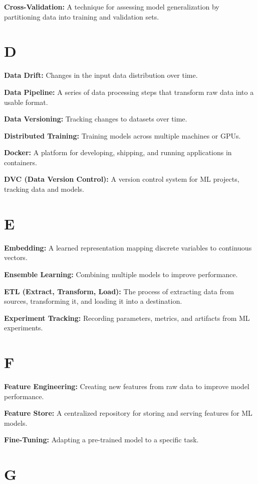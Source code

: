 \textbf{Cross-Validation:} A technique for assessing model generalization by partitioning data into training and validation sets.

\section*{D}

\textbf{Data Drift:} Changes in the input data distribution over time.

\textbf{Data Pipeline:} A series of data processing steps that transform raw data into a usable format.

\textbf{Data Versioning:} Tracking changes to datasets over time.

\textbf{Distributed Training:} Training models across multiple machines or GPUs.

\textbf{Docker:} A platform for developing, shipping, and running applications in containers.

\textbf{DVC (Data Version Control):} A version control system for ML projects, tracking data and models.

\section*{E}

\textbf{Embedding:} A learned representation mapping discrete variables to continuous vectors.

\textbf{Ensemble Learning:} Combining multiple models to improve performance.

\textbf{ETL (Extract, Transform, Load):} The process of extracting data from sources, transforming it, and loading it into a destination.

\textbf{Experiment Tracking:} Recording parameters, metrics, and artifacts from ML experiments.

\section*{F}

\textbf{Feature Engineering:} Creating new features from raw data to improve model performance.

\textbf{Feature Store:} A centralized repository for storing and serving features for ML models.

\textbf{Fine-Tuning:} Adapting a pre-trained model to a specific task.

\section*{G}

